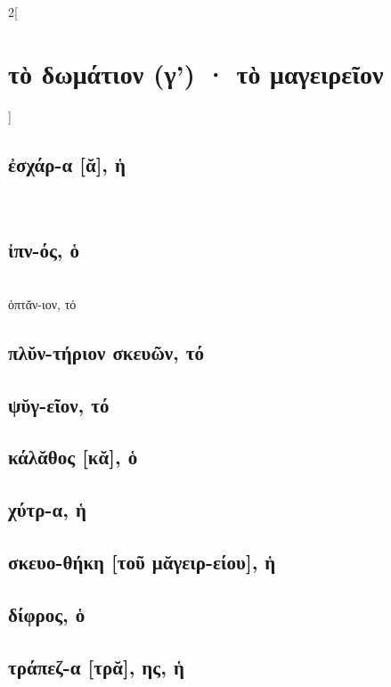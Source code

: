 \documentclass{book}
\begin{document}
\begin{multicols}{2}[\section{τὸ δωμάτιον (γ') · τὸ μαγειρεῖον}]
\subsection{ἐσχάρ-α [ᾰ], ἡ}
 ~\\
\subsection{ἰπν-ός, ὁ}
 ~\\
ὀπτᾰν-ιον, τό
\subsection{πλῠν-τήριον σκευῶν, τό}
\subsection{ψῠγ-εῖον, τό}
\subsection{κάλᾰθος [κᾰ], ὁ}
\subsection{χύτρ-α, ἡ}
\subsection{σκευο-θήκη [τοῦ μᾰγειρ-είου], ἡ}
\subsection{δίφρος, ὁ}
\subsection{τράπεζ-α [τρᾰ], ης, ἡ}
~
\end{multicols}
\newpage  
\end{document}
